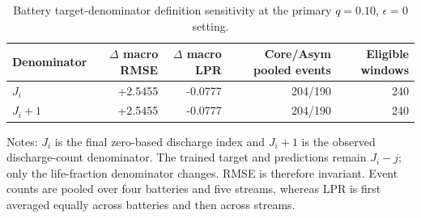 \begin{table}[H]
\centering
\caption{Battery target-denominator definition sensitivity at the primary $q=0.10$, $\epsilon=0$ setting.}
\label{tab:battery-index-sensitivity}
\small
\begin{tabular}{lrrrr}
\toprule
Denominator & $\Delta$ macro RMSE & $\Delta$ macro LPR & Core/Asym pooled events & Eligible windows \\
\midrule
$J_i$ & +2.5455 & -0.0777 & 204/190 & 240 \\
$J_i+1$ & +2.5455 & -0.0777 & 204/190 & 240 \\
\bottomrule
\end{tabular}
\begin{minipage}{0.98\linewidth}\footnotesize Notes: $J_i$ is the final zero-based discharge index and $J_i+1$ is the observed discharge-count denominator. The trained target and predictions remain $J_i-j$; only the life-fraction denominator changes. RMSE is therefore invariant. Event counts are pooled over four batteries and five streams, whereas LPR is first averaged equally across batteries and then across streams.\end{minipage}
\end{table}
